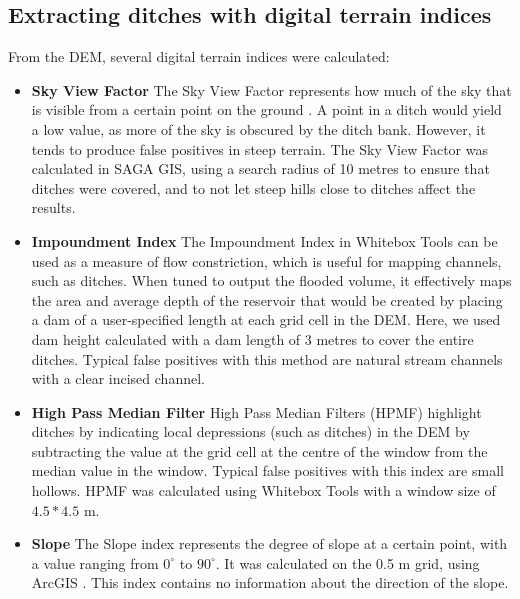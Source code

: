\documentclass[]{interact}
\theoremstyle{plain}%
\theoremstyle{definition}
\theoremstyle{remark}
\begin{document}
\subsection{Extracting ditches with digital terrain indices}
From the DEM, several digital terrain indices were calculated:
\begin{itemize} \label{data_attributes}

  \item \textbf{Sky View Factor} \newline
    The Sky View Factor represents how much of the sky that is visible from a certain point on the ground \citep{zaksek}. A point in a ditch would yield a low value, as more of the sky is obscured by the ditch bank. However, it tends to produce false positives in steep terrain. The Sky View Factor was calculated in SAGA GIS, using a search radius of 10 metres to ensure that ditches were covered, and to not let steep hills close to ditches affect the results.

  \item \textbf{Impoundment Index}\newline
    The Impoundment Index in Whitebox Tools \citep{whiteboxtools} can be used as a measure of flow constriction, which is useful for mapping channels, such as ditches. When tuned to output the flooded volume, it effectively maps the area and average depth of the reservoir that would be created by placing a dam of a user-specified length at each grid cell in the DEM. Here, we used dam height calculated with a dam length of 3 metres to cover the entire ditches. Typical false positives with this method are natural stream channels with a clear incised channel.
  
  \item \textbf{High Pass Median Filter} \newline
    High Pass Median Filters (HPMF) highlight ditches by indicating local depressions (such as ditches) in the DEM by subtracting the value at the grid cell at the centre of the window from the median value in the window. Typical false positives with this index are small hollows. HPMF was calculated using Whitebox Tools \citep{whiteboxtools} with a window size of $4.5 * 4.5$ m. 

    \item \textbf{Slope} \newline
    The Slope index represents the degree of slope at a certain point, with a value ranging from $0^{\circ}$ to $90^{\circ}$. It was calculated on the 0.5 m grid, using ArcGIS \citep{EsriArcGisBook}. This index contains no information about the direction of the slope.
\end{itemize}
\end{document}
